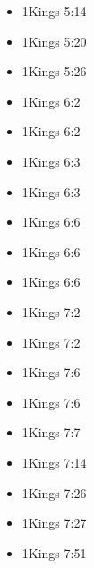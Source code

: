\documentclass[14pt]{article}
\begin{document}
\begin{multicols}{2}
\begin{itemize}
									\item 1Kings 5:14
									
									\item 1Kings 5:20
									
									\item 1Kings 5:26
									
									\item 1Kings 6:2
									
									\item 1Kings 6:2
									
									\item 1Kings 6:3
									
									\item 1Kings 6:3
									
									\item 1Kings 6:6
									
									\item 1Kings 6:6
									
									\item 1Kings 6:6
									
									\item 1Kings 7:2
									
									\item 1Kings 7:2
									
									\item 1Kings 7:6
									
									\item 1Kings 7:6
									
									\item 1Kings 7:7
									
									\item 1Kings 7:14
									
									\item 1Kings 7:26
									
									\item 1Kings 7:27
									
									\item 1Kings 7:51
									

\end{itemize}
\end{multicols}
\end{document}

